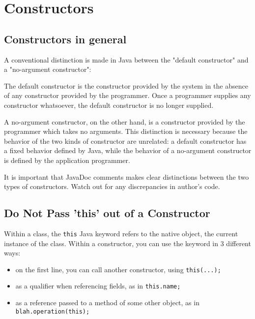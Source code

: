 
\chapter{Constructors}

\section{Constructors in general}

A  conventional distinction is made in Java between the "default constructor" and a "no-argument constructor":

\begin{definition}
The default constructor is the constructor provided by the system in the absence of any constructor provided by the programmer. Once a programmer supplies any constructor whatsoever, the default constructor is no longer supplied.
\end{definition}

\begin{definition}
A no-argument constructor, on the other hand, is a constructor provided by the programmer which takes no arguments. This distinction is necessary because the behavior of the two kinds of constructor are unrelated: a default constructor has a fixed behavior defined by Java, while the behavior of a no-argument constructor is defined by the application programmer.
\end{definition}

\begin{marker}
    It is important that JavaDoc comments makes clear distinctions between the two types of constructors. Watch out for any discrepancies in author's code.
\end{marker}

\section{Do Not Pass 'this' out of a Constructor}

Within a class, the \texttt{this} Java keyword refers to the native object, the current instance of the class. Within a constructor, you can use the keyword in 3 different ways:

\begin{itemize}
    \item on the first line, you can call another constructor, using \texttt{this(...);}
    \item as a qualifier when referencing fields, as in \texttt{this.name;}
    \item as a reference passed to a method of some other object, as in \texttt{blah.operation(this);}
\end{itemize}

